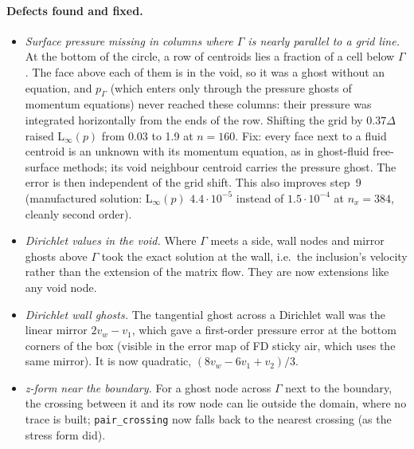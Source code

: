 \documentclass[11pt,a4paper]{article}
\newcommand{\code}[1]{\texttt{#1}}
\begin{document}
\paragraph{Defects found and fixed.}
\begin{itemize}
  \item \emph{Surface pressure missing in columns where $\Gamma$ is nearly parallel to a grid
    line.} At the bottom of the circle, a row of centroids lies a fraction of a cell below
    $\Gamma$. The face above each of them is in the void, so it was a ghost without an
    equation, and $p_\Gamma$ (which enters only through the pressure ghosts of momentum
    equations) never reached these columns: their pressure was integrated horizontally from the
    ends of the row. Shifting the grid by $0.37\Delta$ raised L$_\infty(p)$ from 0.03 to 1.9 at
    $n=160$. Fix: every face next to a fluid centroid is an unknown with its momentum equation,
    as in ghost-fluid free-surface methods; its void neighbour centroid carries the pressure
    ghost. The error is then independent of the grid shift. This also improves step~9
    (manufactured solution: L$_\infty(p)$ $4.4\cdot10^{-5}$ instead of $1.5\cdot10^{-4}$ at
    $n_x=384$, cleanly second order).
  \item \emph{Dirichlet values in the void.} Where $\Gamma$ meets a side, wall nodes and mirror
    ghosts above $\Gamma$ took the exact solution at the wall, i.e.\ the inclusion's velocity
    rather than the extension of the matrix flow. They are now extensions like any void node.
  \item \emph{Dirichlet wall ghosts.} The tangential ghost across a Dirichlet wall was the linear
    mirror $2v_w-v_1$, which gave a first-order pressure error at the bottom corners of the box
    (visible in the error map of FD sticky air, which uses the same mirror). It is now quadratic,
    $(8v_w-6v_1+v_2)/3$.
  \item \emph{z-form near the boundary.} For a ghost node across $\Gamma$ next to the boundary,
    the crossing between it and its row node can lie outside the domain, where no trace is
    built; \code{pair\_crossing} now falls back to the nearest crossing (as the stress form did).
\end{itemize}
\end{document}
